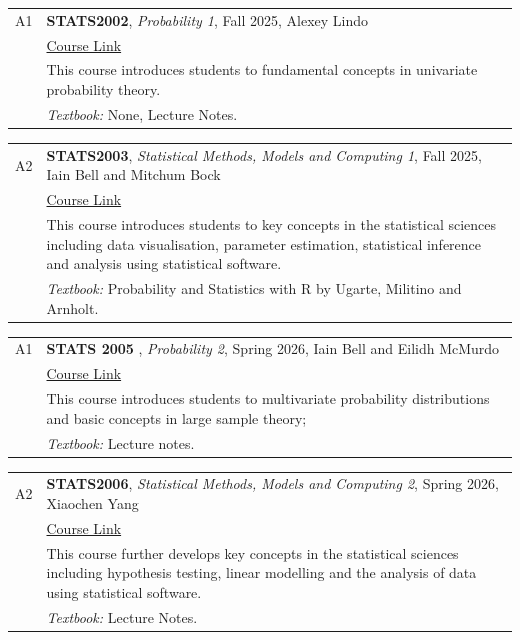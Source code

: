 \documentclass[12pt]{article}
\begin{document}
\begin{itemize}[leftmargin = *]
        \begin{tabularx}{\textwidth}{@{}lX@{}}
            A1 & \textbf{STATS2002}, \textit{Probability 1}, Fall 2025,   Alexey Lindo
            \\
            &
            \href{https://www.gla.ac.uk/coursecatalogue/course/?code=STATS2002}{Course Link} \\
            &
This course introduces students to fundamental concepts in univariate probability theory.            \\
            & \textit{Textbook:}  None, Lecture Notes.
        \end{tabularx}

        \begin{tabularx}{\textwidth}{@{}lX@{}}
        A2 & \textbf{STATS2003}, \textit{Statistical Methods, Models and Computing 1}, Fall 2025, Iain Bell and Mitchum Bock
            \\
            &
            \href{https://www.gla.ac.uk/coursecatalogue/course/?code=STATS2003}{Course Link} \\
            &
           This course introduces students to key concepts in the statistical sciences including data visualisation, parameter estimation, statistical inference and analysis using statistical software.\\
            & \textit{Textbook:}  Probability and Statistics with R by Ugarte, Militino and Arnholt.
        \end{tabularx}

        \begin{tabularx}{\textwidth}{@{}lX@{}}
        A1 & \textbf{STATS 2005 }, \textit{Probability 2}, Spring 2026, Iain Bell and  Eilidh  McMurdo
            \\
            &
            \href{https://www.gla.ac.uk/coursecatalogue/course/?code=STATS2005}{Course Link} \\
            &
           This course introduces students to multivariate probability distributions and basic concepts in large sample theory;\\
            & \textit{Textbook:}  Lecture notes.
        \end{tabularx}

        \begin{tabularx}{\textwidth}{@{}lX@{}}
        A2 & \textbf{STATS2006}, \textit{Statistical Methods, Models and Computing 2}, Spring 2026,  Xiaochen Yang
            \\
            &
            \href{https://www.gla.ac.uk/coursecatalogue/course/?code=STATS2006}{Course Link} \\
            &
           This course further develops key concepts in the statistical sciences including hypothesis testing, linear modelling and the analysis of data using statistical software.\\
            & \textit{Textbook:}  Lecture Notes.
        \end{tabularx}



\end{itemize}
\end{document}
